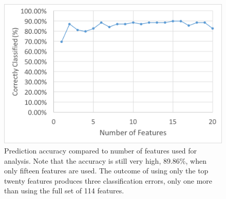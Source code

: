 \documentclass[12pt]{report}
\begin{document}
\begin{figure}[t]
    \centering
        \includegraphics[width=.8\columnwidth,trim={1mm 6mm 1mm 3.5mm},clip]{FeatureAnalysis}
        \vspace{-7pt}
        \caption[Prediction accuracy compared to number of features]{Prediction accuracy compared to number of features used for analysis.  Note that the accuracy is still very high, 89.86\%, when only fifteen features are used.  The outcome of using only the top twenty features produces three classification errors, only one more than using the full set of 114 features. }
        \label{fig:feat_analysis}
\end{figure}
\end{document}
